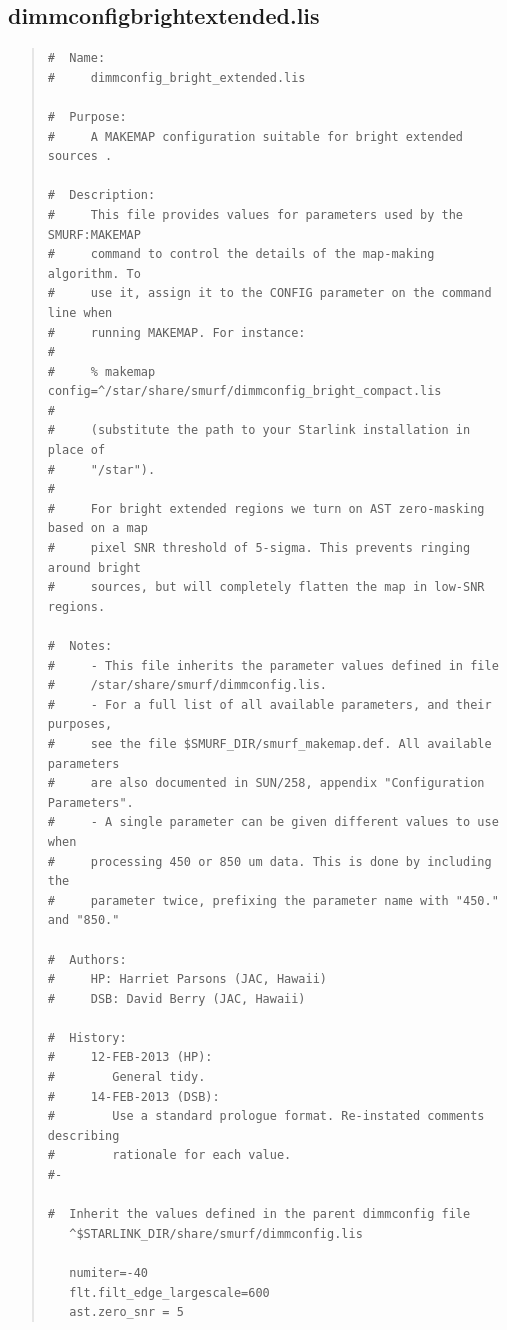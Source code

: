 \documentclass[twoside,11pt]{article}
\renewcommand{\_}{\texttt{\symbol{95}}}
\newenvironment{myquote}{\begin{quote}\begin{small}}{\end{small}\end{quote}}
\begin{document}
\subsection{dimmconfig\_bright\_extended.lis}
\begin{myquote}
\begin{verbatim}
#  Name:
#     dimmconfig_bright_extended.lis

#  Purpose:
#     A MAKEMAP configuration suitable for bright extended sources .

#  Description:
#     This file provides values for parameters used by the SMURF:MAKEMAP
#     command to control the details of the map-making algorithm. To
#     use it, assign it to the CONFIG parameter on the command line when
#     running MAKEMAP. For instance:
#
#     % makemap config=^/star/share/smurf/dimmconfig_bright_compact.lis
#
#     (substitute the path to your Starlink installation in place of
#     "/star").
#
#     For bright extended regions we turn on AST zero-masking based on a map
#     pixel SNR threshold of 5-sigma. This prevents ringing around bright
#     sources, but will completely flatten the map in low-SNR regions.

#  Notes:
#     - This file inherits the parameter values defined in file
#     /star/share/smurf/dimmconfig.lis.
#     - For a full list of all available parameters, and their purposes,
#     see the file $SMURF_DIR/smurf_makemap.def. All available parameters
#     are also documented in SUN/258, appendix "Configuration Parameters".
#     - A single parameter can be given different values to use when
#     processing 450 or 850 um data. This is done by including the
#     parameter twice, prefixing the parameter name with "450." and "850."

#  Authors:
#     HP: Harriet Parsons (JAC, Hawaii)
#     DSB: David Berry (JAC, Hawaii)

#  History:
#     12-FEB-2013 (HP):
#        General tidy.
#     14-FEB-2013 (DSB):
#        Use a standard prologue format. Re-instated comments describing
#        rationale for each value.
#-

#  Inherit the values defined in the parent dimmconfig file
   ^$STARLINK_DIR/share/smurf/dimmconfig.lis

   numiter=-40
   flt.filt_edge_largescale=600
   ast.zero_snr = 5
\end{verbatim}
\end{myquote}
\end{document}
